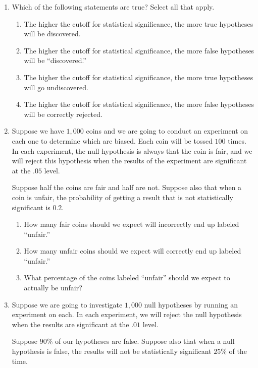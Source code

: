 \documentclass[justified]{tufte-book}
\providecommand{\tightlist}{%
  \setlength{\itemsep}{0pt}\setlength{\parskip}{0pt}}
\theoremstyle{definition}
\theoremstyle{definition}
\theoremstyle{definition}
\theoremstyle{definition}
\theoremstyle{remark}
\begin{document}
\begin{enumerate}
\item
  Which of the following statements are true? Select all that apply.

  \begin{enumerate}
  \def\labelenumii{\alph{enumii}.}
  \tightlist
  \item
    The higher the cutoff for statistical significance, the more true hypotheses will be discovered.
  \item
    The higher the cutoff for statistical significance, the more false hypotheses will be ``discovered.''
  \item
    The higher the cutoff for statistical significance, the more true hypotheses will go undiscovered.
  \item
    The higher the cutoff for statistical significance, the more false hypotheses will be correctly rejected.
  \end{enumerate}
\item
  Suppose we have \(1,000\) coins and we are going to conduct an experiment on each one to determine which are biased. Each coin will be tossed \(100\) times. In each experiment, the null hypothesis is always that the coin is fair, and we will reject this hypothesis when the results of the experiment are significant at the \(.05\) level.

  Suppose half the coins are fair and half are not. Suppose also that when a coin is unfair, the probability of getting a result that is not statistically significant is \(0.2\).

  \begin{enumerate}
  \def\labelenumii{\alph{enumii}.}
  \tightlist
  \item
    How many fair coins should we expect will incorrectly end up labeled ``unfair.''
  \item
    How many unfair coins should we expect will correctly end up labeled ``unfair.''
  \item
    What percentage of the coins labeled ``unfair'' should we expect to actually be unfair?
  \end{enumerate}
\item
  Suppose we are going to investigate \(1,000\) null hypotheses by running an experiment on each. In each experiment, we will reject the null hypothesis when the results are significant at the \(.01\) level.

  Suppose \(90\%\) of our hypotheses are false. Suppose also that when a null hypothesis is false, the results will not be statistically significant \(25\%\) of the time.


\end{enumerate}
\end{document}
